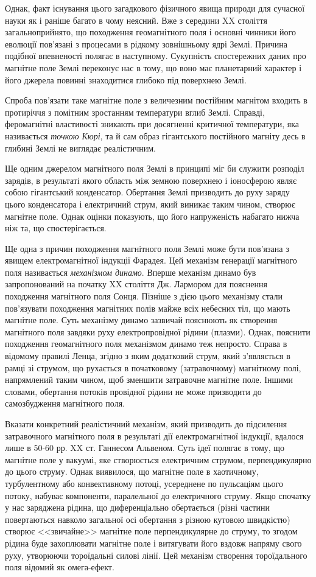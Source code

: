 Однак, факт існування цього загадкового фізичного явища природи для сучасної науки як і раніше багато в чому неясний. Вже з середини XX століття загальноприйнято, що походження геомагнітного поля і основні чинники його еволюції пов'язані з процесами в рідкому зовнішньому ядрі Землі. Причина подібної впевненості полягає в наступному. Сукупність спостережних даних про магнітне поле Землі переконує нас в тому, що воно має планетарний характер і його джерела повинні знаходитися глибоко під поверхнею Землі.

Спроба пов'язати таке магнітне поле з величезним постійним магнітом входить в протиріччя з помітним зростанням температури вглиб Землі. Справді, феромагнітні властивості зникають при досягненні критичної температури, яка називається \emph{точкою Кюрі}, та й сам образ гігантського постійного магніту десь в глибині Землі не виглядає реалістичним.

Ще одним джерелом магнітного поля Землі в принципі міг би служити розподіл зарядів, в результаті якого область між земною поверхнею і іоносферою являє собою гігантський конденсатор. Обертання Землі призводить до руху заряду цього конденсатора і електричний струм, який виникає таким чином, створює магнітне поле. Однак оцінки показують, що його напруженість набагато нижча ніж та, що спостерігається.

Ще одна з причин походження магнітного поля Землі може бути пов'язана з явищем електромагнітної індукції Фарадея. Цей механізм генерації магнітного поля називається \emph{механізмом динамо}. Вперше механізм динамо був запропонований на початку XX століття  Дж. Лармором для пояснення походження магнітного поля Сонця. Пізніше з дією цього механізму стали пов'язувати походження магнітних полів майже всіх небесних тіл, що мають магнітне поле. Суть механізму динамо зазвичай пояснюють як створення магнітного поля завдяки руху електропровідної рідини (плазми). Однак, пояснити походження геомагнітного поля механізмом динамо теж непросто. Справа в відомому правилі Ленца, згідно з яким додатковий струм, який з'являється в рамці зі струмом, що рухається в початковому (затравочному) магнітному полі, напрямлений таким чином, щоб зменшити затравочне магнітне поле. Іншими словами, обертання потоків провідної рідини не може призводити до самозбудження магнітного поля.

Вказати конкретний реалістичний механізм, який призводить до підсилення затравочного магнітного поля в результаті дії електромагнітної індукції, вдалося лише в 50-60 рр. XX ст. Ганнесом Альвеном. Суть ідеї полягає в тому, що магнітне поле у вакуумі, яке створюється електричним струмом, перпендикулярно до цього струму. Однак виявилося, що магнітне поле в хаотичному, турбулентному або конвективному потоці, усереднене по пульсаціям цього потоку, набуває компоненти, паралельної до електричного струму. Якщо спочатку у нас заряджена рідина, що диференціально обертається (різні частини повертаються навколо загальної осі обертання з різною кутовою швидкістю) створює <<звичайне>> магнітне поле перпендикулярне до струму, то згодом рідина буде захоплювати магнітне поле і витягувати його вздовж напряму свого руху, утворюючи тороїдальні силові лінії. Цей механізм створення тороїдального поля відомий як омега-ефект.

